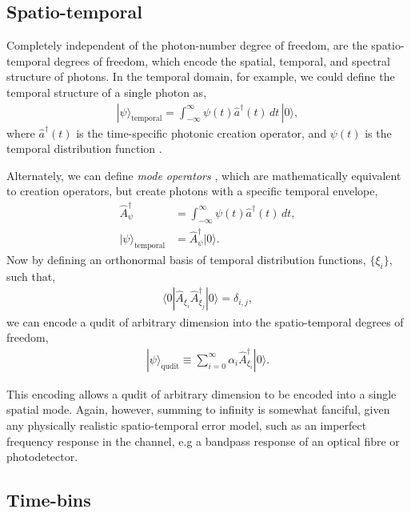 \documentclass[aps,rmp,twocolumn,amsmath,amssymb,nofootinbib,superscriptaddress,longbibliography,floatfix]{revtex4-1}
\newcommand{\bra}[1]{\langle#1|}
\newcommand{\ket}[1]{|#1\rangle}
\begin{document}
\subsection{Spatio-temporal} \label{sec:spatio_temporal}

Completely independent of the photon-number degree of freedom, are the spatio-temporal degrees of freedom, which encode the spatial, temporal, and spectral structure of photons. In the temporal domain, for example, we could define the temporal structure of a single photon as,
\begin{align}
\ket\psi_\mathrm{temporal} = \int_{-\infty}^\infty \psi(t) \hat{a}^\dag(t)\,dt\,\ket{0},
\end{align}
where $\hat{a}^\dag(t)$ is the time-specific photonic creation operator, and $\psi(t)$ is the temporal distribution function \cite{bib:RohdeFreqTemp05}.

Alternately, we can define \emph{mode operators} \cite{bib:RohdeMauererSilberhorn07}, which are mathematically equivalent to creation operators, but create photons with a specific temporal envelope,
\begin{align}
\hat{A}^\dag_\psi &= \int_{-\infty}^\infty \psi(t) \hat{a}^\dag(t)\,dt, \nonumber \\
\ket\psi_\mathrm{temporal} &= \hat{A}^\dag_\psi \ket{0}.
\end{align}
Now by defining an orthonormal basis of temporal distribution functions, $\{\xi_i\}$, such that,
\begin{align}
\bra{0} \hat{A}_{\xi_i} \hat{A}^\dag_{\xi_j}\ket{0} = \delta_{i,j},
\end{align}
we can encode a qudit of arbitrary dimension into the spatio-temporal degrees of freedom,
\begin{align}
\ket\psi_\mathrm{qudit} \equiv \sum_{i=0}^\infty \alpha_i \hat{A}^\dag_{\xi_i} \ket{0}.
\end{align}

This encoding allows a qudit of arbitrary dimension to be encoded into a single spatial mode. Again, however, summing to infinity is somewhat fanciful, given any physically realistic spatio-temporal error model, such as an imperfect frequency response in the channel, e.g a bandpass response of an optical fibre or photodetector.

%
%

\subsection{Time-bins} \label{sec:time_bin}
\end{document}
